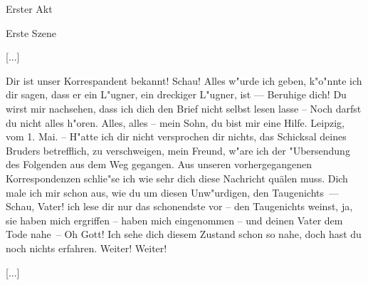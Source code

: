 
\begin{center}

\Large{Erster Akt}

\large{Erste Szene}

\end{center}


[...]



\begin{drama}

\franspeaks {} Dir ist unser Korrespandent bekannt! Schau! Alles w"urde ich geben, k"o"nnte ich dir sagen, dass er ein L"ugner, ein dreckiger L"ugner, ist --- Beruhige dich! Du wirst mir nachsehen, dass ich dich den Brief nicht selbst lesen lasse -- Noch darfst du nicht alles h"oren.
\moorspeaks Alles, alles -- mein Sohn, du bist mir eine Hilfe.
\franspeaks {} \frqq Leipzig, vom 1. Mai. -- H"atte ich dir nicht versprochen dir nichts, das Schicksal deines Bruders betrefflich, zu verschweigen, mein Freund, w"are ich der "Ubersendung des Folgenden aus dem Weg gegangen. Aus unseren vorhergegangenen Korrespondenzen schlie"se ich wie sehr dich diese Nachricht quälen muss. Dich male ich mir schon aus, wie du um diesen Unw"urdigen, den Taugenichts\flqq \ ---  Schau, Vater! ich lese dir nur das schonendste vor -- \frqq den Taugenichts weinst\flqq , ja, sie haben mich ergriffen -- haben mich eingenommen -- \frqq und deinen Vater dem Tode nahe\flqq \ -- Oh Gott! Ich sehe dich diesem Zustand schon so nahe, doch hast du noch nichts erfahren.
\moorspeaks Weiter! Weiter!

\end{drama}

[...]

\endinput